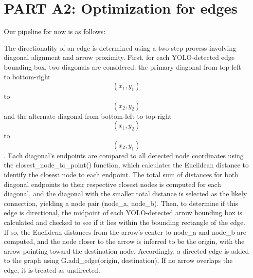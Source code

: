 \documentclass{article}
\begin{document}
\section{PART A2: Optimization for edges}

Our pipeline for now is as follows:

The directionality of an edge is determined using a two-step process involving diagonal alignment and arrow proximity. First, for each YOLO-detected edge bounding box, two diagonals are considered: the primary diagonal from top-left to bottom-right $$(x_1, y_1)$$ to $$(x_2, y_2)$$ and the alternate diagonal from bottom-left to top-right $$(x_1, y_2)$$ to $$(x_2, y_1)$$. Each diagonal’s endpoints are compared to all detected node coordinates using the closest\_node\_to\_point() function, which calculates the Euclidean distance to identify the closest node to each endpoint. The total sum of distances for both diagonal endpoints to their respective closest nodes is computed for each diagonal, and the diagonal with the smaller total distance is selected as the likely connection, yielding a node pair (node\_a, node\_b). Then, to determine if this edge is directional, the midpoint of each YOLO-detected arrow bounding box is calculated and checked to see if it lies within the bounding rectangle of the edge. If so, the Euclidean distances from the arrow’s center to node\_a and node\_b are computed, and the node closer to the arrow is inferred to be the origin, with the arrow pointing toward the destination node. Accordingly, a directed edge is added to the graph using G.add\_edge(origin, destination). If no arrow overlaps the edge, it is treated as undirected.
\end{document}
